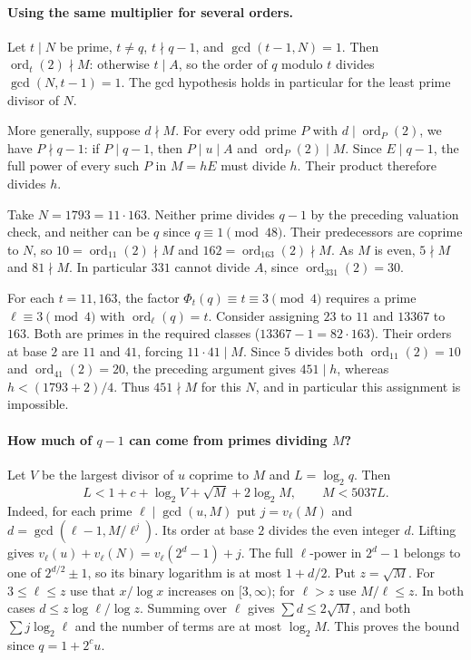 \documentclass[11pt]{article}
\begin{document}
\paragraph{Using the same multiplier for several orders.}
Let $t\mid N$ be prime, $t\ne q$, $t\nmid q-1$, and
$\gcd(t-1,N)=1$. Then $\operatorname{ord}_t(2)\nmid M$:
otherwise $t\mid A$, so the order of $q$ modulo $t$ divides
$\gcd(N,t-1)=1$. The gcd hypothesis holds in particular for
the least prime divisor of $N$.

More generally, suppose $d\nmid M$. For every odd prime $P$
with $d\mid\operatorname{ord}_P(2)$, we have $P\nmid q-1$:
if $P\mid q-1$, then $P\mid u\mid A$ and
$\operatorname{ord}_P(2)\mid M$. Since $E\mid q-1$, the full
power of every such $P$ in $M=hE$ must divide $h$. Their product
therefore divides $h$.

Take $N=1793=11\cdot163$. Neither prime divides $q-1$ by the
preceding valuation check, and neither can be $q$ since
$q\equiv1\pmod{48}$. Their predecessors are coprime to $N$,
so $10=\operatorname{ord}_{11}(2)\nmid M$ and
$162=\operatorname{ord}_{163}(2)\nmid M$. As $M$ is even,
$5\nmid M$ and $81\nmid M$. In particular $331$ cannot divide
$A$, since $\operatorname{ord}_{331}(2)=30$.

For each $t=11,163$, the factor $\Phi_t(q)\equiv t\equiv3\pmod4$
requires a prime $\ell\equiv3\pmod4$ with $\operatorname{ord}_\ell(q)=t$.
Consider assigning $23$ to $11$ and $13367$ to $163$. Both are
primes in the required classes ($13367-1=82\cdot163$).
Their orders at base $2$ are $11$ and $41$, forcing $11\cdot41\mid M$.
Since $5$ divides both $\operatorname{ord}_{11}(2)=10$ and
$\operatorname{ord}_{41}(2)=20$, the preceding argument gives
$451\mid h$, whereas $h<(1793+2)/4$. Thus $451\nmid M$ for this
$N$, and in particular this assignment is impossible.

\paragraph{How much of $q-1$ can come from primes dividing $M$?}
Let $V$ be the largest divisor of $u$ coprime to $M$ and $L=\log_2 q$.
Then
\[
 L<1+c+\log_2 V+\sqrt M+2\log_2 M,\qquad M<5037L.
\]
Indeed, for each prime $\ell\mid\gcd(u,M)$ put $j=v_\ell(M)$ and
$d=\gcd(\ell-1,M/\ell^j)$. Its order at base $2$ divides the even
integer $d$. Lifting gives
$v_\ell(u)+v_\ell(N)=v_\ell(2^d-1)+j$. The full $\ell$-power
in $2^d-1$ belongs to one of $2^{d/2}\pm1$, so its binary
logarithm is at most $1+d/2$. Put $z=\sqrt M$. For $3\le\ell\le z$
use that $x/\log x$ increases on $[3,\infty)$; for $\ell>z$
use $M/\ell\le z$. In both cases $d\le z\log\ell/\log z$.
Summing over $\ell$ gives $\sum d\le2\sqrt M$, and both
$\sum j\log_2\ell$ and the number of terms are at most $\log_2 M$.
This proves the bound since $q=1+2^c u$.
\end{document}
